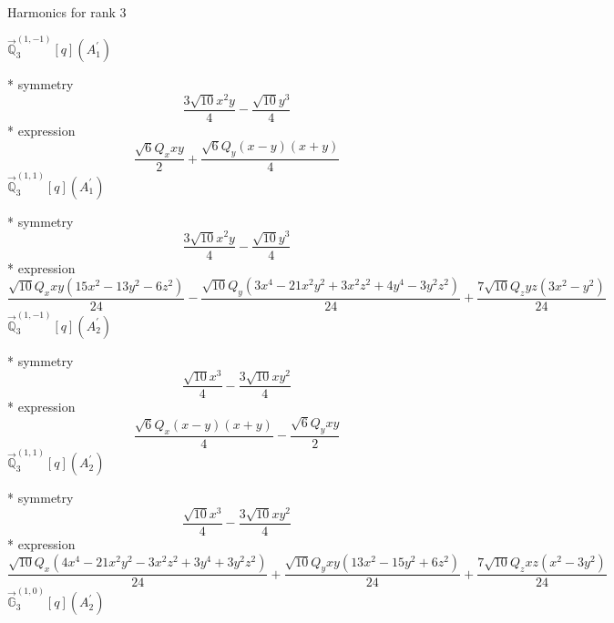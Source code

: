 \documentclass[fleqn,8pt]{jsarticle}
\begin{document}
\noindent * Harmonics for rank 3

\noindent\quad $\vec{\mathbb{Q}}_{3}^{(1,-1)}[q](A_{1}^{\prime})$

\noindent\quad ** symmetry
\begin{dmath*}
\frac{3 \sqrt{10} x^{2} y}{4} - \frac{\sqrt{10} y^{3}}{4}
\end{dmath*}
\noindent\quad ** expression
\begin{dmath*}
\frac{\sqrt{6} Q_{x} x y}{2} + \frac{\sqrt{6} Q_{y} \left(x - y\right) \left(x + y\right)}{4}
\end{dmath*}
\noindent\quad $\vec{\mathbb{Q}}_{3}^{(1,1)}[q](A_{1}^{\prime})$

\noindent\quad ** symmetry
\begin{dmath*}
\frac{3 \sqrt{10} x^{2} y}{4} - \frac{\sqrt{10} y^{3}}{4}
\end{dmath*}
\noindent\quad ** expression
\begin{dmath*}
\frac{\sqrt{10} Q_{x} x y \left(15 x^{2} - 13 y^{2} - 6 z^{2}\right)}{24} - \frac{\sqrt{10} Q_{y} \left(3 x^{4} - 21 x^{2} y^{2} + 3 x^{2} z^{2} + 4 y^{4} - 3 y^{2} z^{2}\right)}{24} + \frac{7 \sqrt{10} Q_{z} y z \left(3 x^{2} - y^{2}\right)}{24}
\end{dmath*}
\noindent\quad $\vec{\mathbb{Q}}_{3}^{(1,-1)}[q](A_{2}^{\prime})$

\noindent\quad ** symmetry
\begin{dmath*}
\frac{\sqrt{10} x^{3}}{4} - \frac{3 \sqrt{10} x y^{2}}{4}
\end{dmath*}
\noindent\quad ** expression
\begin{dmath*}
\frac{\sqrt{6} Q_{x} \left(x - y\right) \left(x + y\right)}{4} - \frac{\sqrt{6} Q_{y} x y}{2}
\end{dmath*}
\noindent\quad $\vec{\mathbb{Q}}_{3}^{(1,1)}[q](A_{2}^{\prime})$

\noindent\quad ** symmetry
\begin{dmath*}
\frac{\sqrt{10} x^{3}}{4} - \frac{3 \sqrt{10} x y^{2}}{4}
\end{dmath*}
\noindent\quad ** expression
\begin{dmath*}
\frac{\sqrt{10} Q_{x} \left(4 x^{4} - 21 x^{2} y^{2} - 3 x^{2} z^{2} + 3 y^{4} + 3 y^{2} z^{2}\right)}{24} + \frac{\sqrt{10} Q_{y} x y \left(13 x^{2} - 15 y^{2} + 6 z^{2}\right)}{24} + \frac{7 \sqrt{10} Q_{z} x z \left(x^{2} - 3 y^{2}\right)}{24}
\end{dmath*}
\noindent\quad $\vec{\mathbb{G}}_{3}^{(1,0)}[q](A_{2}^{\prime})$
\end{document}
